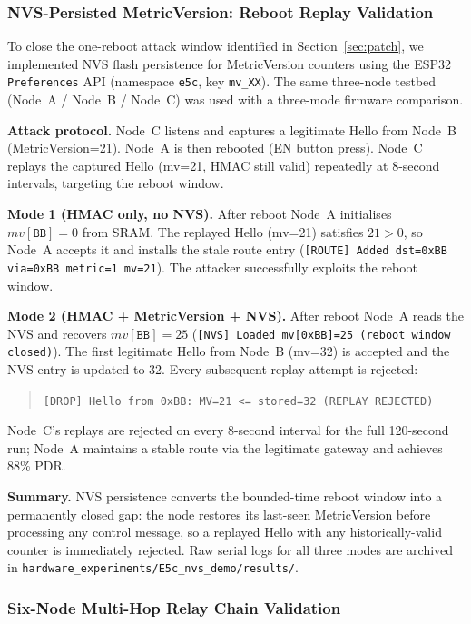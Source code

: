 \documentclass[10pt,journal,compsoc]{IEEEtran}
\begin{document}
\subsubsection{NVS-Persisted MetricVersion: Reboot Replay Validation}
\label{sec:hardware-nvs}

To close the one-reboot attack window identified in Section~\ref{sec:patch},
we implemented NVS flash persistence for MetricVersion counters using the
ESP32 \texttt{Preferences} API (namespace \texttt{e5c}, key \texttt{mv\_XX}).
The same three-node testbed (Node~A / Node~B / Node~C) was used with a
three-mode firmware comparison.

\textbf{Attack protocol.}
Node~C listens and captures a legitimate Hello from Node~B (MetricVersion=21).
Node~A is then rebooted (EN button press).
Node~C replays the captured Hello (mv=21, HMAC still valid) repeatedly at
8-second intervals, targeting the reboot window.

\textbf{Mode 1 (HMAC only, no NVS).}
After reboot Node~A initialises $mv[\texttt{BB}]=0$ from SRAM.
The replayed Hello (mv=21) satisfies $21 > 0$, so Node~A accepts it and
installs the stale route entry (\texttt{[ROUTE] Added dst=0xBB via=0xBB metric=1 mv=21}).
The attacker successfully exploits the reboot window.

\textbf{Mode 2 (HMAC + MetricVersion + NVS).}
After reboot Node~A reads the NVS and recovers $mv[\texttt{BB}]=25$
(\texttt{[NVS]~Loaded mv[0xBB]=25 (reboot window closed)}).
The first legitimate Hello from Node~B (mv=32) is accepted and the NVS entry
is updated to 32.
Every subsequent replay attempt is rejected:
\begin{quote}\small
\texttt{[DROP] Hello from 0xBB: MV=21 <= stored=32 (REPLAY REJECTED)}
\end{quote}
Node~C's replays are rejected on every 8-second interval for the full
120-second run; Node~A maintains a stable route via the legitimate gateway
and achieves 88\% PDR.

\textbf{Summary.}
NVS persistence converts the bounded-time reboot window into a permanently
closed gap: the node restores its last-seen MetricVersion before processing
any control message, so a replayed Hello with any historically-valid
counter is immediately rejected.
Raw serial logs for all three modes are archived in
\texttt{hardware\_experiments/E5c\_nvs\_demo/results/}.

\subsubsection{Six-Node Multi-Hop Relay Chain Validation}
\label{sec:hardware-e6}
\end{document}
